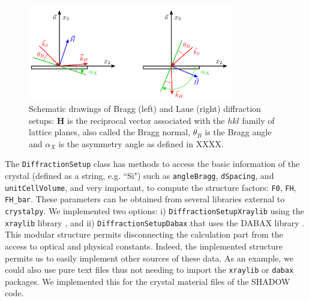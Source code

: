 \documentclass[preprint]{iucr}              %
\begin{document}


\begin{figure}
    \centering
    \includegraphics[width=0.8\textwidth]{figures/edo_sketch.png}
    \caption{Schematic drawings of Bragg (left) and Laue (right) diffraction setups: \textbf{H} is the reciprocal vector associated with the $hkl$ family of lattice planes, also called the Bragg normal, $\theta_B$ is the Bragg angle and $\alpha_X$ is the asymmetry angle as defined in XXXX.}
    \label{fig:edo_sketch}
\end{figure}

The {\tt DiffractionSetup} class has methods to access the basic information of the crystal (defined as a string, e.g. ``Si") such as {\tt angleBragg}, {\tt dSpacing}, and {\tt unitCellVolume}, and very important, to compute the structure factors: {\tt F0}, {\tt FH}, {\tt FH\_bar}. These parameters can be obtained from several libraries external to {\tt crystalpy}. We implemented two options: i) {\tt DiffractionSetupXraylib} using the {\tt xraylib} library \cite{xraylib}, and ii) {\tt DiffractionSetupDabax} that uses the DABAX library \cite{dabax}. This modular structure permits disconnecting the calculation part from the access to optical and physical constants. Indeed, the implemented structure permits us to easily implement other sources of these data. As an example, we could also use pure text files thus not needing to import the {\tt xraylib} or {\tt dabax} packages. We implemented this for the crystal material files of the SHADOW~\cite{codeSHADOW} code.
\end{document}
